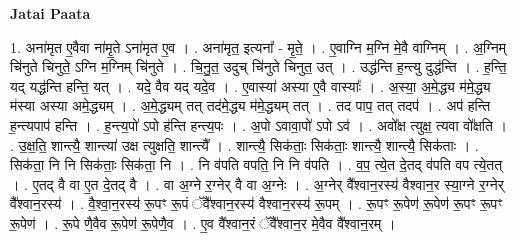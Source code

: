 \documentclass[17pt]{extarticle}
\begin{document}
\textbf{Jatai Paata} \newline

1. अना॑मृत ए॒वैवा ना॑मृ॒ते ऽना॑मृत ए॒व । . अना॑मृत॒ इत्यना᳚ - मृ॒ते॒ । . ए॒वाग्नि म॒ग्नि मे॒वै वाग्निम् । . अ॒ग्निम् चि॑नुते चिनुते॒ ऽग्नि म॒ग्निम् चि॑नुते । . चि॒नु॒त॒ उदुच् चि॑नुते चिनुत॒ उत् । . उद्ध॑न्ति ह॒न्त्यु दुद्ध॑न्ति । . ह॒न्ति॒ यद् यद्ध॑न्ति हन्ति॒ यत् । . यदे॒ वैव यद् यदे॒व । . ए॒वास्या॑ अस्या ए॒वै वास्याः᳚ । . अ॒स्या॒ अ॒मे॒द्ध्य म॑मे॒द्ध्य म॑स्या अस्या अमे॒द्ध्यम् । . अ॒मे॒द्ध्यम् तत् तद॑मे॒द्ध्य म॑मे॒द्ध्यम् तत् । . तद पाप॒ तत् तदप॑ । . अप॑ हन्ति ह॒न्त्यपाप॑ हन्ति । . ह॒न्त्य॒पो॑ ऽपो ह॑न्ति हन्त्य॒पः । . अ॒पो ऽवावा॒पो॑ ऽपो ऽव॑ । . अवो᳚क्ष त्युक्ष॒ त्यवा वो᳚क्षति । . उ॒क्ष॒ति॒ शान्त्यै॒ शान्त्या॑ उक्ष त्युक्षति॒ शान्त्यै᳚ । . शान्त्यै॒ सिक॑ताः॒ सिक॑ताः॒ शान्त्यै॒ शान्त्यै॒ सिक॑ताः । . सिक॑ता॒ नि नि सिक॑ताः॒ सिक॑ता॒ नि । . नि व॑पति वपति॒ नि नि व॑पति । . व॒प॒ त्ये॒त दे॒तद् व॑पति वप त्ये॒तत् । . ए॒तद् वै वा ए॒त दे॒तद् वै । . वा अ॒ग्ने र॒ग्नेर् वै वा अ॒ग्नेः । . अ॒ग्नेर् वै᳚श्वान॒रस्य॑ वैश्वान॒र स्या॒ग्ने र॒ग्नेर् वै᳚श्वान॒रस्य॑ । . वै॒श्वा॒न॒रस्य॑ रू॒पꣳ रू॒पं ॅवै᳚श्वान॒रस्य॑ वैश्वान॒रस्य॑ रू॒पम् । . रू॒पꣳ रू॒पेण॑ रू॒पेण॑ रू॒पꣳ रू॒पꣳ रू॒पेण॑ । . रू॒पे णै॒वैव रू॒पेण॑ रू॒पेणै॒व । . ए॒व वै᳚श्वान॒रं ॅवै᳚श्वान॒र मे॒वैव वै᳚श्वान॒रम् । \newline
\end{document}
